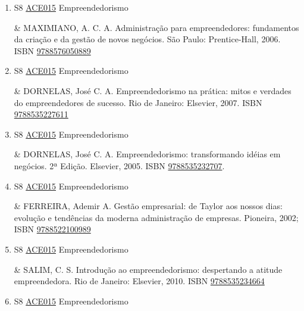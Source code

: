 \documentclass[12pt,a4paper]{book}
\begin{document}
\begin{enumerate}
 \item S8 \hyperref[PUD:ACE015]{ACE015} Empreendedorismo

&   MAXIMIANO, A.  C.  A.  Administração para empreendedores: fundamentos da criação e da gestão de novos negócios.  São Paulo: Prentice-Hall, 2006.  ISBN \href{http://www.bn.br/site/pages/servicosProfissionais/agenciaISBN/isbnBusca/FbnBuscaISBNCatalogo.asp?pField=ISBN&pIntPagina=1&pISBN=76050889&nidbISBN=true&hidbISBN=true}{9788576050889}
 

 \item S8 \hyperref[PUD:ACE015]{ACE015} Empreendedorismo

&   DORNELAS, José C.  A.  Empreendedorismo na prática: mitos e verdades do empreendedores de sucesso.  Rio de Janeiro: Elsevier, 2007.  ISBN \href{http://www.bn.br/site/pages/servicosProfissionais/agenciaISBN/isbnBusca/FbnBuscaISBNCatalogo.asp?pField=ISBN&pIntPagina=1&pISBN=35227611&nidbISBN=true&hidbISBN=true}{9788535227611}
 

 \item S8 \hyperref[PUD:ACE015]{ACE015} Empreendedorismo

&   DORNELAS, José C.  A.  Empreendedorismo: transformando idéias em negócios.  2ª Edição.  Elsevier, 2005.  ISBN \href{http://www.bn.br/site/pages/servicosProfissionais/agenciaISBN/isbnBusca/FbnBuscaISBNCatalogo.asp?pField=ISBN&pIntPagina=1&pISBN=35232707&nidbISBN=true&hidbISBN=true}{9788535232707}.
 \item S8 \hyperref[PUD:ACE015]{ACE015} Empreendedorismo

&   FERREIRA, Ademir A.  Gestão empresarial: de Taylor aos nossos dias: evolução e tendências da moderna administração de empresas.  Pioneira, 2002;  ISBN \href{http://www.bn.br/site/pages/servicosProfissionais/agenciaISBN/isbnBusca/FbnBuscaISBNCatalogo.asp?pField=ISBN&pIntPagina=1&pISBN=22100989&nidbISBN=true&hidbISBN=true}{9788522100989}
 

 \item S8 \hyperref[PUD:ACE015]{ACE015} Empreendedorismo

&   SALIM, C.  S.  Introdução ao empreendedorismo: despertando a atitude empreendedora.  Rio de Janeiro: Elsevier, 2010.  ISBN \href{http://www.bn.br/site/pages/servicosProfissionais/agenciaISBN/isbnBusca/FbnBuscaISBNCatalogo.asp?pField=ISBN&pIntPagina=1&pISBN=35234664&nidbISBN=true&hidbISBN=true}{9788535234664}
 

 \item S8 \hyperref[PUD:ACE015]{ACE015} Empreendedorismo


\end{enumerate}
\end{document}
